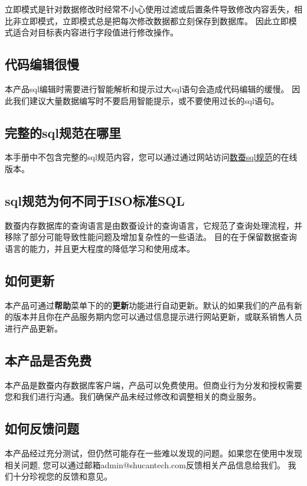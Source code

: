 立即模式是针对数据修改时经常不小心使用过滤或后置条件导致修改内容丢失，相比非立即模式，立即模式总是把每次修改数据都立刻保存到数据库。
因此立即模式适合对目标表内容进行字段值进行修改操作。


\subsection{代码编辑很慢}
\bigskip

本产品sql编辑时需要进行智能解析和提示过大sql语句会造成代码编辑的缓慢。
因此我们建议大量数据编写时不要启用智能提示，或不要使用过长的sql语句。

\subsection{完整的sql规范在哪里}
\bigskip

本手册中不包含完整的sql规范内容，您可以通过通过网站访问\href{http://www.shucantech.com/zh/sql_ref_0.2.0.html}{数蚕sql规范}的在线版本。

\subsection{sql规范为何不同于ISO标准SQL}
\bigskip

数蚕内存数据库的查询语言是由数蚕设计的查询语言，它规范了查询处理流程，并移除了部分可能导致性能问题及增加复杂性的一些语法。
目的在于保留数据查询语言的能力，并且更大程度的降低学习和使用成本。

\subsection{如何更新}
\bigskip

本产品可通过\textbf{帮助}菜单下的的\textbf{更新}功能进行自动更新。默认的如果我们的产品有新的版本并且你在产品服务期内您可以通过信息提示进行网站更新，或联系销售人员进行产品更新。

\subsection{本产品是否免费}
\bigskip

本产品是数蚕内存数据库客户端，产品可以免费使用。但商业行为分发和授权需要您和我们进行沟通。我们确保产品未经过修改和调整相关的商业服务。

\subsection{如何反馈问题}
\bigskip

本产品经过充分测试，但仍然可能存在一些难以发现的问题。如果您在使用中发现相关问题,
您可以通过邮箱admin@shucantech.com反馈相关产品信息给我们。
我们十分珍视您的反馈和意见。

